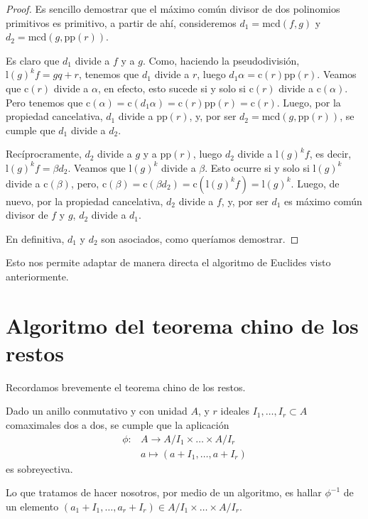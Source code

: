 \documentclass[a4paper, 11pt, twoside, notitlepage, openany, onecolumn, final]{report}
\begin{document}
\begin{proof}
	Es sencillo demostrar que el máximo común divisor de dos polinomios primitivos es primitivo, a partir de ahí, consideremos $d_1=\text{mcd}(f,g)$ y $d_2=\text{mcd}(g,\text{pp}(r))$.
	
	Es claro que $d_1$ divide a $f$ y a $g$. Como, haciendo la pseudodivisión, $\text{l}(g)^kf=gq+r$, tenemos que $d_1$ divide a $r$, luego $d_1\alpha = \text{c}(r)\text{pp}(r)$. Veamos que $\text{c}(r)$ divide a $\alpha$, en efecto, esto sucede si y solo si $\text{c}(r)$ divide a $\text{c}(\alpha)$. Pero tenemos que $\text{c}(\alpha)=\text{c}(d_1\alpha)=\text{c}(r)\text{pp}(r)=\text{c}(r)$. Luego, por la propiedad cancelativa, $d_1$ divide a $\text{pp}(r)$, y, por ser $d_2=\text{mcd}(g,\text{pp}(r))$, se cumple que $d_1$ divide a $d_2$.
	
	Recíprocramente, $d_2$ divide a $g$ y a $\text{pp}(r)$, luego $d_2$ divide a $\text{l}(g)^kf$, es decir, $\text{l}(g)^kf=\beta d_2$. Veamos que $\text{l}(g)^k$ divide a $\beta$. Esto ocurre si y solo si $\text{l}(g)^k$ divide a $\text{c}(\beta)$, pero, $\text{c}(\beta)=\text{c}(\beta d_2)=\text{c}(\text{l}(g)^kf)=\text{l}(g)^k$. Luego, de nuevo, por la propiedad cancelativa, $d_2$ divide a $f$, y, por ser $d_1$ es máximo común divisor de $f$ y $g$, $d_2$ divide a $d_1$.
	
	En definitiva, $d_1$ y $d_2$ son asociados, como queríamos demostrar.
\end{proof}
Esto nos permite adaptar de manera directa el algoritmo de Euclides visto anteriormente.
	\section{Algoritmo del teorema chino de los restos}
	Recordamos brevemente el teorema chino de los restos.
	\begin{theo}
		Dado un anillo conmutativo y con unidad $A$, y $r$ ideales $I_1,\dots,I_r\subset A$ comaximales dos a dos, se cumple que la aplicación
		\begin{equation*}
			\begin{array}{cc}
			\phi:&A\to A/I_1\times\dots\times A/I_r\\
			& a\mapsto (a+I_1,\dots,a+I_r)
			\end{array}
		\end{equation*}
		es sobreyectiva.
	\end{theo}
	Lo que tratamos de hacer nosotros, por medio de un algoritmo, es hallar $\phi^{-1}$ de un elemento $(a_1+I_1,\dots,a_r+I_r)\in A/I_1\times\dots\times A/I_r$.
\end{document}
